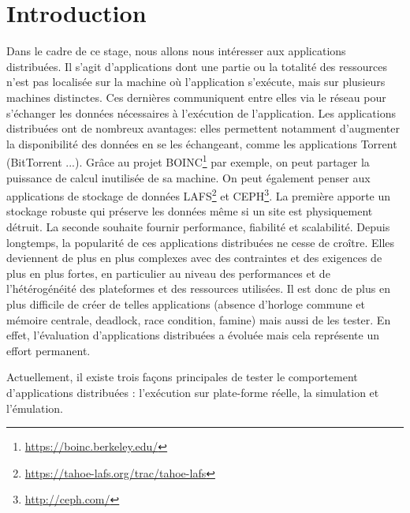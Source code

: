 \section{Introduction}



Dans le cadre de ce stage, nous allons nous intéresser aux applications
distribuées. Il s'agit d'applications dont une partie ou la totalité des
ressources n'est pas localisée sur la machine où l'application s'exécute, mais
sur plusieurs machines distinctes. Ces dernières communiquent entre elles via le
réseau pour s'échanger les données nécessaires à l'exécution de
l'application. Les applications distribuées ont de nombreux avantages: elles
permettent notamment d'augmenter la disponibilité des données en se les
échangeant, comme les applications Torrent (BitTorrent ...). Grâce au
projet BOINC\footnote{\url{https://boinc.berkeley.edu/}} par exemple, on peut
partager la puissance de calcul inutilisée de sa machine. On peut également
penser aux applications de stockage de données
LAFS\footnote{\url{https://tahoe-lafs.org/trac/tahoe-lafs}} et
CEPH\footnote{\url{http://ceph.com/}}. La première apporte un stockage robuste
qui préserve les données même si un site est physiquement détruit. La seconde
souhaite fournir performance, fiabilité et scalabilité. Depuis longtemps, la popularité de ces applications distribuées ne cesse de
croître. Elles deviennent de plus en plus complexes avec des contraintes et des
exigences de plus en plus fortes, en particulier au niveau des performances et
de l'hétérogénéité des plateformes et des ressources utilisées. Il est donc de
plus en plus difficile de créer de telles applications (absence d'horloge
commune et mémoire centrale, deadlock, race condition, famine) mais aussi de les
tester. En effet, l'évaluation d'applications distribuées a évoluée mais cela représente un effort permanent.
\newline

Actuellement, il existe trois façons principales de tester le comportement
d'applications distribuées \citep{gustedt2009experimental}: l'exécution sur
plate-forme réelle, la simulation et l'émulation.

